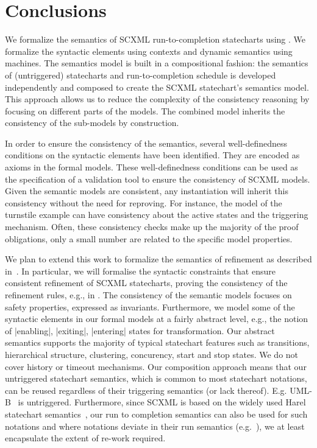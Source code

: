 \section{Conclusions}
\label{sec:conclusions}

We formalize the semantics of SCXML run-to-completion statecharts using \EventB. We formalize the syntactic elements using \EventB contexts and dynamic semantics using \EventB machines.  The semantics model is built in a compositional fashion: the semantics of (untriggered) statecharts and run-to-completion schedule is developed independently and composed to create the SCXML statechart's semantics model. This approach allows us to reduce the complexity of the consistency reasoning by focusing on different parts of the models. The combined model inherits the consistency of the sub-models by construction.

In order to ensure the consistency of the semantics, several well-definedness conditions on the syntactic elements have been identified. They are encoded as axioms in the formal models. These well-definedness conditions can be used as the specification of a validation tool to ensure the consistency of SCXML models. Given the semantic models are consistent, any instantiation will inherit this consistency without the need for reproving. For instance, the model of the turnstile example can have consistency about the active states and the triggering mechanism. Often, these consistency checks make up the majority of the proof  obligations, only a small number are related to the specific model properties.

We plan to extend this work to formalize the semantics of refinement as described in~\cite{Morris2018,Morris2020}. In particular, we will formalise the syntactic constraints that ensure consistent refinement of SCXML statecharts, proving the consistency of the refinement rules, e.g., in \cite{DBLP:journals/isse/MorrisSHHAB22}.  The consistency of the semantic models focuses on safety properties, expressed as invariants. Furthermore, we model some of the syntactic elements in our formal models at a fairly abstract level, e.g., the notion of |enabling|, |exiting|, |entering| states for transformation. 
Our abstract semantics supports the majority of typical statechart features such as transitions, hierarchical structure, clustering, concurency, start and stop states. 
We do not cover history or timeout mechanisms. 
Our composition approach means that our untriggered statechart semantics, which is common to most statechart notations, can be reused regardless of their triggering semantics (or lack thereof).
E.g. UML-B~\cite{DBLP:conf/sefm/SnookBHFD22} is untriggered.
Furthermore, since SCXML is based on the widely used Harel statechart semantics~\cite{HAREL1987231}, our run to completion semantics can also be used for such notations and where notations deviate in their run semantics (e.g.~\cite{Eshuis_2009}), we at least encapsulate the extent of re-work required.  
